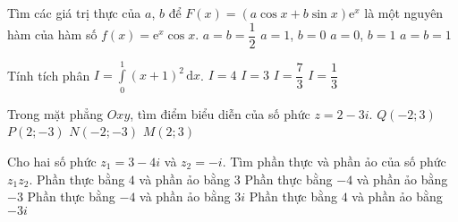 \begin{ex}%
Tìm các giá trị thực của $a$, $b$ để $F(x)=(a\cos x+b\sin x)\mathrm{e}^x$ là một nguyên hàm của hàm số $f(x)=\mathrm{e}^x\cos x$.
\choice
{\True $a=b=\dfrac{1}{2}$}
{$a=1$, $b=0$}
{$a=0$, $b=1$}
{$a=b=1$}
\end{ex}

\begin{ex}%
Tính tích phân $I=\displaystyle\int\limits_{0}^{1} (x+1)^2\mathrm{\,d}x$.
\choice
{$I=4$}
{$I=3$}
{\True $I=\dfrac{7}{3}$}
{$I=\dfrac{1}{3}$}
\end{ex}

\begin{ex}%
Trong mặt phẳng $Oxy$, tìm điểm biểu diễn của số phức $z=2-3i$.
\choice
{$Q(-2;3)$}
{\True $P(2;-3)$}
{$N(-2;-3)$}
{$M(2;3)$}
\end{ex}

\begin{ex}%
Cho hai số phức $z_1=3-4i$ và $z_2=-i$. Tìm phần thực và phần ảo của số phức $z_1z_2$.
\choice
{Phần thực bằng $4$ và phần ảo bằng $3$}
{\True Phần thực bằng $-4$ và phần ảo bằng $-3$}
{Phần thực bằng $-4$ và phần ảo bằng $3i$}
{Phần thực bằng $4$ và phần ảo bằng $-3i$}
\end{ex}

